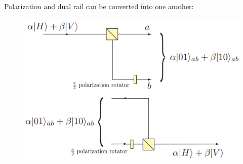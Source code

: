 \documentclass{beamer}
\begin{document}
\begin{frame}
\begin{center}

Polarization and dual rail can be converted into one another:

\begin{figure}[!htb]
\centering
\includegraphics[scale=.25]{immagini/conversion2.png}
\end{figure}

\end{center}
\end{frame}
\end{document}
